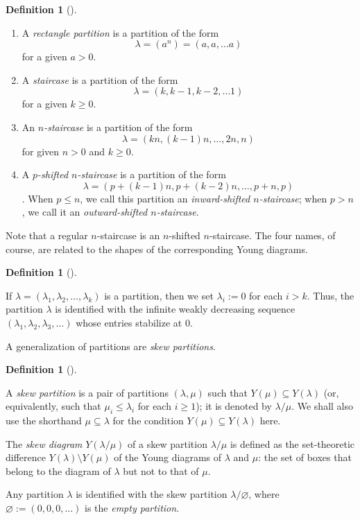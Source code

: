 \documentclass[numbers=enddot,12pt,final,onecolumn,notitlepage]{scrartcl}%
\theoremstyle{definition}
\newtheorem{defi}[theo]{Definition}
\newenvironment{definition}[1][]
{\begin{defi}[#1]\begin{leftbar}}
{\end{leftbar}\end{defi}}
\newcommand{\tup}[1]{\left( #1 \right)}
\renewcommand{\leq}{\leqslant}
\renewcommand{\geq}{\geqslant}
\theoremstyle{plainsl}
\begin{document}
\begin{definition}
\begin{enumerate}
    \item A \emph{rectangle partition} is a partition of the form 
\[\lambda = (a^n) = (a,a, \ldots a)\]
for a given $a > 0$.
    \item A \emph{staircase} is a partition of the form 
\[\lambda = (k, k-1, k-2, \ldots 1)\]
for a given $k \geq 0$.
    \item An \emph{$n$-staircase} is a partition of the form 
\[\lambda = (kn, (k-1)n, \ldots, 2n,  n)\]
for given $n > 0$ and $k \geq 0$.
    \item A \emph{$p$-shifted $n$-staircase} is a partition of the form
\[\lambda = (p+(k-1)n, p+(k-2)n, \ldots,p+n, p) \].
When $p \leq n$, we call this partition an \emph{inward-shifted $n$-staircase};
when $p > n$, we call it an \emph{outward-shifted $n$-staircase}.
\end{enumerate}

\end{definition}

Note that a regular $n$-staircase is an $n$-shifted $n$-staircase.
The four names, of course, are related to the shapes of the corresponding Young diagrams.

\begin{definition}
If $\lambda = \tup{\lambda_1, \lambda_2, \ldots, \lambda_k}$ is
a partition, then we set $\lambda_i := 0$ for each $i > k$.
Thus, the partition $\lambda$ is identified with the infinite
weakly decreasing
sequence $\tup{\lambda_1, \lambda_2, \lambda_3, \ldots}$
whose entries stabilize at $0$.
\end{definition}

A generalization of partitions are \emph{skew partitions}.

\begin{definition}
A \emph{skew partition} is a pair of partitions $(\lambda, \mu)$ such that $Y\tup{\mu} \subseteq Y\tup{\lambda}$ (or, equivalently, such that $\mu_i \leq \lambda_i$ for each $i \geq 1$); it is denoted by $\lambda / \mu$.
We shall also use the shorthand $\mu \subseteq \lambda$ for the condition $Y\tup{\mu} \subseteq Y\tup{\lambda}$ here.

The \emph{skew diagram} $Y\tup{\lambda / \mu}$ of a skew partition $\lambda / \mu$ is defined as the set-theoretic difference $Y\tup{\lambda} \setminus Y\tup{\mu}$ of the Young diagrams of $\lambda$ and $\mu$: the set of boxes that belong to the diagram of $\lambda$ but not to that of $\mu$.

Any partition $\lambda$ is identified with the skew partition $\lambda / \varnothing$, where $\varnothing := \tup{0,0,0,\ldots}$ is the \emph{empty partition}.
\end{definition}
\end{document}
